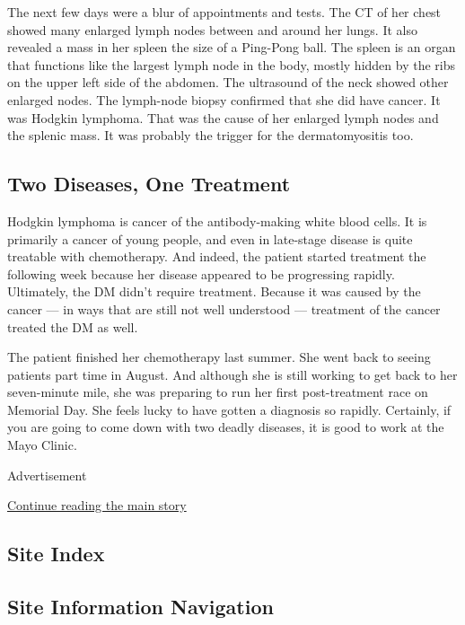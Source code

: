 The next few days were a blur of appointments and tests. The CT of her
chest showed many enlarged lymph nodes between and around her lungs. It
also revealed a mass in her spleen the size of a Ping-Pong ball. The
spleen is an organ that functions like the largest lymph node in the
body, mostly hidden by the ribs on the upper left side of the abdomen.
The ultrasound of the neck showed other enlarged nodes. The lymph-node
biopsy confirmed that she did have cancer. It was Hodgkin lymphoma. That
was the cause of her enlarged lymph nodes and the splenic mass. It was
probably the trigger for the dermatomyositis too.

\hypertarget{two-diseases-one-treatment}{%
\subsection{\texorpdfstring{\textbf{Two Diseases, One
Treatment}}{Two Diseases, One Treatment}}\label{two-diseases-one-treatment}}

Hodgkin lymphoma is cancer of the antibody-making white blood cells. It
is primarily a cancer of young people, and even in late-stage disease is
quite treatable with chemotherapy. And indeed, the patient started
treatment the following week because her disease appeared to be
progressing rapidly. Ultimately, the DM didn't require treatment.
Because it was caused by the cancer --- in ways that are still not well
understood --- treatment of the cancer treated the DM as well.

The patient finished her chemotherapy last summer. She went back to
seeing patients part time in August. And although she is still working
to get back to her seven-minute mile, she was preparing to run her first
post-treatment race on Memorial Day. She feels lucky to have gotten a
diagnosis so rapidly. Certainly, if you are going to come down with two
deadly diseases, it is good to work at the Mayo Clinic.

Advertisement

\protect\hyperlink{after-bottom}{Continue reading the main story}

\hypertarget{site-index}{%
\subsection{Site Index}\label{site-index}}

\hypertarget{site-information-navigation}{%
\subsection{Site Information
Navigation}\label{site-information-navigation}}

